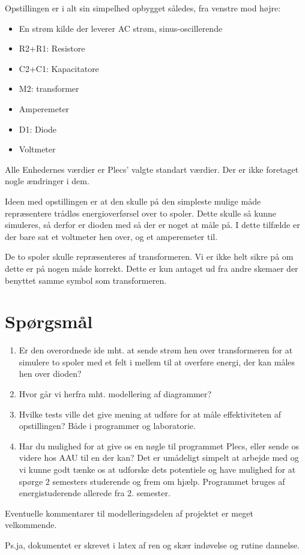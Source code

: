 \documentclass[a4paper,11pt]{memoir}
\begin{document}
Opstillingen er i alt sin simpelhed opbygget således, fra venstre mod højre:

\begin{itemize}
\item En strøm kilde der leverer AC strøm, sinus-oscillerende
\item R2+R1: Resistore
\item C2+C1: Kapacitatore
\item M2: transformer
\item Amperemeter
\item D1: Diode
\item Voltmeter
\end{itemize}

Alle Enhedernes værdier er Plecs' valgte standart værdier. Der er ikke foretaget nogle ændringer i dem.

Ideen med opstillingen er at den skulle på den simpleste mulige måde repræsentere trådløs energioverførsel over to spoler. Dette skulle så kunne simuleres, så derfor er dioden med så der er noget at måle på. I dette tilfælde er der bare sat et voltmeter hen over, og et amperemeter til.

De to spoler skulle repræsenteres af transformeren. Vi er ikke helt sikre på om dette er på nogen måde korrekt. Dette er kun antaget ud fra andre skemaer der benyttet samme symbol som transformeren.

\section{Spørgsmål}
\begin{enumerate}
\item Er den overordnede ide mht. at sende strøm hen over transformeren for at simulere to spoler med et felt i mellem til at overføre energi, der kan måles hen over dioden?
\item Hvor går vi herfra mht. modellering af diagrammer?
\item Hvilke tests ville det give mening at udføre for at måle effektiviteten af opstillingen? Både i programmer og laboratorie.
\item Har du mulighed for at give os en nøgle til programmet Plecs, eller sende os videre hos AAU til en der kan? Det er umådeligt simpelt at arbejde med og vi kunne godt tænke os at udforske dets potentiele og have mulighed for at spørge 2 semesters studerende og frem om hjælp. Programmet bruges af energistuderende allerede fra 2. semester.
\end{enumerate}
Eventuelle kommentarer til modelleringsdelen af projektet er meget velkommende.

Ps.ja, dokumentet er skrevet i latex af ren og skær indøvelse og rutine dannelse.
\end{document}

